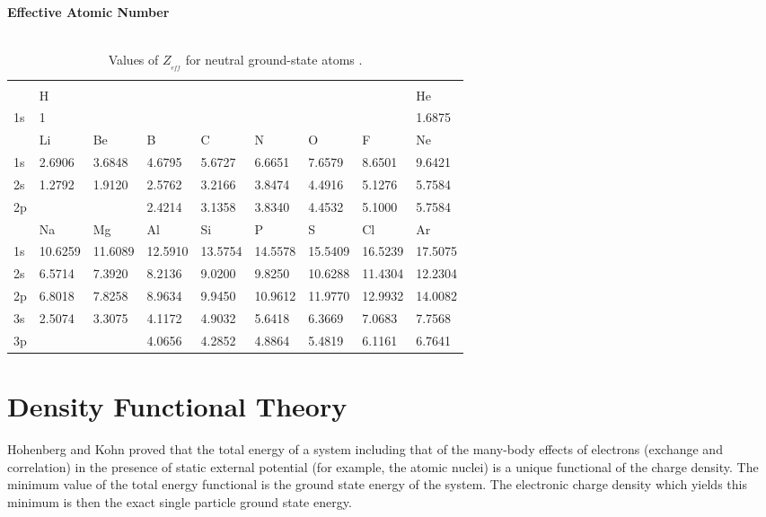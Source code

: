 \begin{table}[hbtp]
\begin{center} {\large \bf Effective Atomic Number} \\ 
$\phantom{a}$ \\
\begin{tabular}{lllllllll}
\hline\\
  & H     &       &       &       &       &       &       & He    \\
1s& 1     &       &       &       &       &       &       & 1.6875\\
  & Li    & Be    & B     & C     & N     & O     & F     & Ne    \\
1s& 2.6906& 3.6848& 4.6795& 5.6727& 6.6651& 7.6579& 8.6501& 9.6421\\
2s& 1.2792& 1.9120& 2.5762& 3.2166& 3.8474& 4.4916& 5.1276& 5.7584\\
2p&       &       & 2.4214& 3.1358& 3.8340& 4.4532& 5.1000& 5.7584\\
  & Na    & Mg    & Al    & Si    & P     & S     & Cl    & Ar    \\
1s&10.6259&11.6089&12.5910&13.5754&14.5578&15.5409&16.5239&17.5075\\
2s& 6.5714& 7.3920& 8.2136& 9.0200& 9.8250&10.6288&11.4304&12.2304\\
2p& 6.8018& 7.8258& 8.9634& 9.9450&10.9612&11.9770&12.9932&14.0082\\
3s& 2.5074& 3.3075& 4.1172& 4.9032& 5.6418& 6.3669& 7.0683& 7.7568\\
3p&       &       & 4.0656& 4.2852& 4.8864& 5.4819& 6.1161& 6.7641\\ [10pt]
\hline
\end{tabular} 
\end{center}
\caption{Values of $Z_{_{eff}}$ for neutral ground-state atoms
  \cite{clementi1963}.}
\label{Zeff}
\end{table}

\section{Density Functional Theory}

Hohenberg and Kohn \cite{hohenbergkohn1964} proved that 
the total energy of a system including that of the many-body 
effects of electrons (exchange and correlation) in the presence of 
static external potential (for example, the atomic nuclei) 
is a unique functional of the charge density. The minimum value of the total energy functional 
is the ground state energy of the system. The electronic charge density which yields this 
minimum is then the exact single particle ground state energy.

